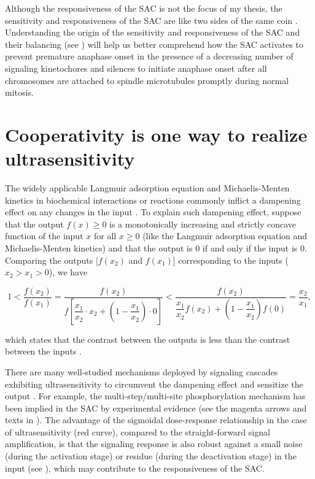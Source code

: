 Although the responsiveness of the SAC is not the focus of my thesis, the sensitivity and responsiveness of the SAC are like two sides of the same coin \cite{eSAC}. Understanding the origin of the sensitivity and responsiveness of the SAC and their balancing (see ) will help us better comprehend how the SAC activates to prevent premature anaphase onset in the presence of a decreasing number of signaling kinetochores and silences to initiate anaphase onset after all chromosomes are attached to spindle microtubules promptly during normal mitosis.

\section{Cooperativity is one way to realize ultrasensitivity}

The widely applicable Langmuir adsorption equation and Michaelis-Menten kinetics in biochemical interactions or reactions commonly inflict a dampening effect on any changes in the input \cite{CooperativityQA}. To explain such dampening effect, suppose that the output $f(x) \geq 0$ is a monotonically increasing and strictly concave function of the input $x$ for all $x \geq 0$ (like the Langmuir adsorption equation and Michaelis-Menten kinetics) and that the output is 0 if and only if the input is 0. Comparing the outputs [$f(x_2)$ and $f(x_1)$] corresponding to the inputs ($x_2 > x_1 > 0$), we have

\begin{equation*}
    1 < \dfrac{f(x_2)}{f(x_1)} = \dfrac{f(x_2)}{f[\dfrac{x_1}{x_2} \cdot x_2 + (1-\dfrac{x_1}{x_2}) \cdot 0]} < \dfrac{f(x_2)}{\dfrac{x_1}{x_2}f(x_2) + (1-\dfrac{x_1}{x_2})f(0)} = \dfrac{x_2}{x_1},
\end{equation*}

\noindent which states that the contrast between the outputs is less than the contrast between the inputs \cite{InhibitorUltrasensitivity}.

There are many well-studied mechanisms deployed by signaling cascades exhibiting ultrasensitivity to circumvent the dampening effect and sensitize the output \cite{ZeroOrder, MultistepUltrasensitivity, Bistability}. For example, the multi-step/multi-site phosphorylation mechanism has been implied in the SAC by experimental evidence \cite{Ji2017eLife} (see the magenta arrows and texts in ). The advantage of the sigmoidal dose-response relationship in the case of ultrasensitivity (red curve), compared to the straight-forward signal amplification, is that the signaling response is also robust against a small noise (during the activation stage) or residue (during the deactivation stage) in the input (see ), which may contribute to the responsiveness of the SAC.

